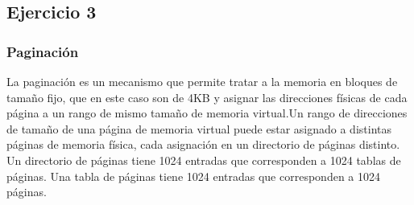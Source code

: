 \subsection{Ejercicio 3}
\subsubsection{Paginación}
La paginación es un mecanismo que permite tratar a la memoria en bloques de tamaño fijo, que en este caso son de 4KB y asignar las direcciones físicas de cada página a un rango de mismo tamaño de memoria virtual.\newline Un rango de direcciones de tamaño de una página de memoria virtual puede estar asignado a distintas páginas de memoria física, cada asignación en un directorio de páginas distinto.
\newline Un directorio de páginas tiene 1024 entradas que corresponden a 1024 tablas de páginas. Una tabla de páginas tiene 1024 entradas que corresponden a 1024 páginas.

